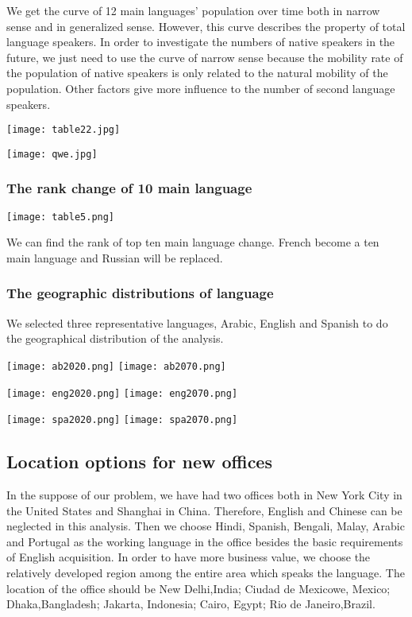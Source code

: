 \documentclass{mcmthesis}
\begin{document}
We get the curve of 12 main languages' population over time both in narrow sense and in generalized sense. However, this curve describes the property of total language speakers. In order to investigate the numbers of native speakers in the future, we just need to use the curve of narrow sense because the mobility rate of the population of native speakers is only related to the natural mobility of the population. Other factors give more influence to the number of second language speakers.

\texttt{[image: table22.jpg]}

\texttt{[image: qwe.jpg]}



\subsubsection{The rank change of 10 main language}



\texttt{[image: table5.png]}


We can find the rank of top ten main language change. French become a ten main language and Russian will be replaced.


\subsubsection{The geographic distributions of language}

We selected three representative languages, Arabic, English and Spanish to do the geographical distribution of the analysis.

\texttt{[image: ab2020.png]}
\texttt{[image: ab2070.png]}



\texttt{[image: eng2020.png]}
\texttt{[image: eng2070.png]}



\texttt{[image: spa2020.png]}
\texttt{[image: spa2070.png]}

\subsection{Location options for new offices}

In the suppose of our problem, we have had two offices both in New York City in the United States and Shanghai in China. Therefore, English and Chinese can be neglected in this analysis. Then we choose Hindi, Spanish, Bengali, Malay, Arabic and Portugal as the working language in the office besides the basic requirements of English acquisition. In order to have more business value, we choose the relatively developed region among the entire area which speaks the language. The location of the office should be New Delhi,India; Ciudad de Mexicowe, Mexico; Dhaka,Bangladesh; Jakarta, Indonesia; Cairo, Egypt; Rio de Janeiro,Brazil.
\end{document}
